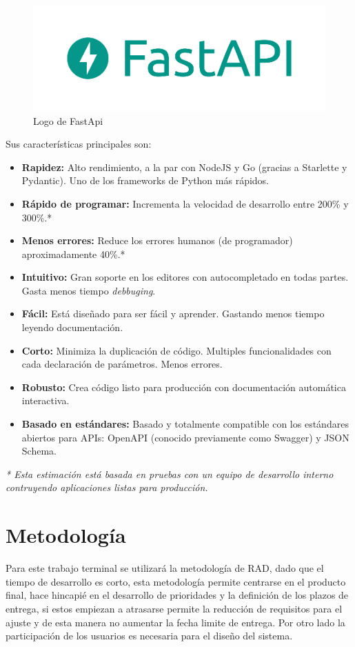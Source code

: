\begin{figure}[!ht]
    \centering
    \includegraphics[scale=0.250]{TT/img/analisis/logofastapi.png}
    \caption{Logo de FastApi}
    \label{graphic:logoFastApi}
\end{figure}
Sus características principales son:
\begin{itemize}
    \item \textbf{Rapidez: }Alto rendimiento, a la par con NodeJS y Go (gracias a Starlette y Pydantic). Uno de los frameworks de Python más rápidos.
    \item \textbf{Rápido de programar: }Incrementa la velocidad de desarrollo entre 200\% y 300\%.*
    \item \textbf{Menos errores: }Reduce los errores humanos (de programador) aproximadamente 40\%.*
    \item \textbf{Intuitivo: }Gran soporte en los editores con autocompletado en todas partes. Gasta menos tiempo \textit{debbuging}.
    \item \textbf{Fácil: }Está diseñado para ser fácil y aprender. Gastando menos tiempo leyendo documentación.
    \item \textbf{Corto: }Minimiza la duplicación de código. Multiples funcionalidades con cada declaración de parámetros. Menos errores.
    \item \textbf{Robusto: }Crea código listo para producción con documentación automática interactiva.
    \item \textbf{Basado en estándares: }Basado y totalmente compatible con los estándares abiertos para APIs:  OpenAPI (conocido previamente como Swagger) y JSON Schema.
\end{itemize}

\textit{* Esta estimación está basada en pruebas con un equipo de desarrollo interno contruyendo aplicaciones listas para producción.}
\section{Metodología}
Para este trabajo terminal se utilizará la metodología de \acrfull{RAD}, dado que el tiempo de desarrollo es corto, esta metodología permite centrarse en el producto final, hace hincapié en el desarrollo de prioridades y la definición de los plazos de entrega, si estos empiezan a atrasarse permite la reducción de requisitos para el ajuste y de esta manera no aumentar la fecha limite de entrega. Por otro lado la participación de los usuarios es necesaria para el diseño del sistema.\cite{dra}

